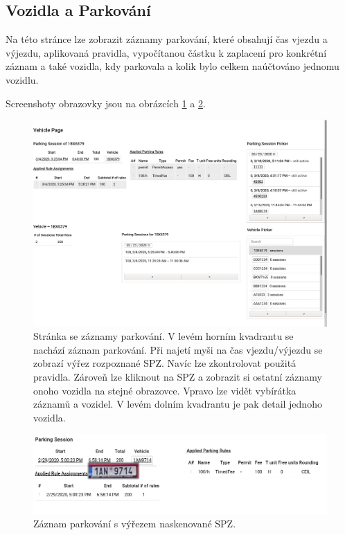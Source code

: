 \subsection{Vozidla a Parkování}

\noindent
Na této stránce lze zobrazit záznamy parkování, které obsahují čas vjezdu a výjezdu,
aplikovaná pravidla, vypočítanou částku k zaplacení pro konkrétní záznam a také vozidla,
kdy parkovala a kolik bylo celkem naúčtováno jednomu vozidlu.

Screenshoty obrazovky jsou na obrázcích \ref{fig:page_vehicles1} a \ref{fig:page_vehicles2}.

\begin{figure}[htb!] \centering
  \includegraphics[width=145mm]{../img/page_vehicles1.png}
  \caption[Stránka se záznamy parkování.]{Stránka se záznamy parkování. V levém horním kvadrantu
  se nachází záznam parkování. Při najetí myši na čas vjezdu/výjezdu se zobrazí výřez rozpoznané SPZ.
  Navíc lze zkontrolovat použitá pravidla.
  Zároveň lze kliknout na SPZ a zobrazit si ostatní záznamy onoho vozidla na stejné obrazovce.
  Vpravo lze vidět vybírátka záznamů a vozidel. V levém dolním kvadrantu je pak detail jednoho
  vozidla.}
  \label{fig:page_vehicles1}
\end{figure}

\begin{figure}[htb!] \centering
  \includegraphics[width=145mm]{../img/page_vehicles2.png}
  \caption[Záznam parkování.]{Záznam parkování s výřezem naskenované SPZ.}
  \label{fig:page_vehicles2}
\end{figure}

